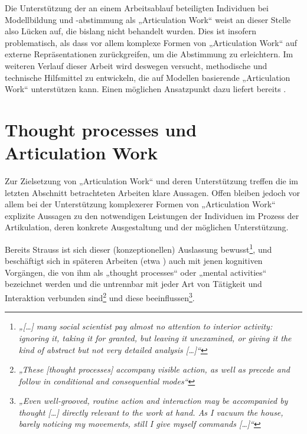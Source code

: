 Die Unterstützung der an einem Arbeitsablauf beteiligten Individuen bei Modellbildung und -abstimmung als „Articulation Work“ weist an dieser Stelle also Lücken auf, die bislang nicht behandelt wurden. Dies ist insofern problematisch, als dass vor allem komplexe Formen von „Articulation Work“ auf externe Repräsentationen zurückgreifen, um die Abstimmung zu erleichtern. Im weiteren Verlauf dieser Arbeit wird deswegen versucht, methodische und technische Hilfsmittel zu entwickeln, die auf Modellen basierende „Articulation Work“ unterstützen kann. Einen möglichen Ansatzpunkt dazu liefert bereits \citet{Strauss93}.



\section{Thought processes und Articulation Work} %
\label{sec:aw_fazit}

Zur Zielsetzung von „Articulation Work“ und deren Unterstützung treffen die im letzten Abschnitt betrachteten Arbeiten klare Aussagen. Offen bleiben jedoch vor allem bei der Unterstützung komplexerer Formen von „Articulation Work“ explizite Aussagen zu den notwendigen Leistungen der Individuen im Prozess der Artikulation, deren konkrete Ausgestaltung und der möglichen Unterstützung. 

Bereits Strauss ist sich dieser (konzeptionellen) Auslassung bewusst\footnote{\emph{„[\ldots] many social scientist pay almost no attention to interior activity: ignoring it, taking it for granted, but leaving it unexamined, or giving it the kind of abstract but not very detailed analysis [\ldots]“}\citep[][S. 131]{Strauss93}}, und beschäftigt sich in späteren Arbeiten (etwa \citep{Strauss93}) auch mit jenen kognitiven Vorgängen, die von ihm als „thought processes“ oder „mental activities“ bezeichnet werden und die untrennbar mit jeder Art von Tätigkeit und Interaktion verbunden sind\footnote{\emph{„These [thought processes] accompany visible action, as well as precede and follow in conditional and consequential modes“}\citep[][S. 146]{Strauss93}} und diese beeinflussen\footnote{\emph{„Even well-grooved, routine action and interaction may be accompanied by thought [\ldots] directly relevant to the work at hand. As I vacuum the house, barely noticing my movements, still I give myself commands [\ldots]“}\citep[][S. 132]{Strauss93}}. 

